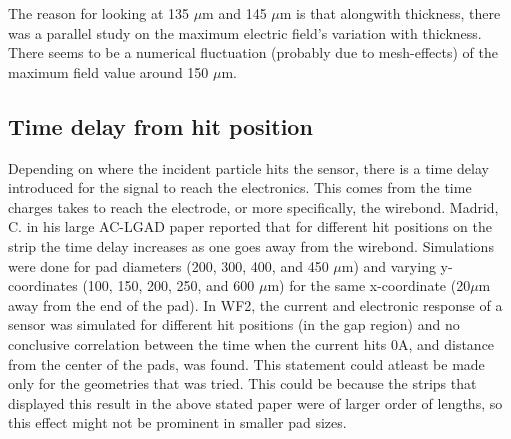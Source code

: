 \documentclass[11pt]{article}
\begin{document}
The reason for looking at 135 $\mu$m and 145 $\mu$m is that alongwith thickness, there was a parallel study on the maximum electric field's variation with thickness. There seems to be a numerical fluctuation (probably due to mesh-effects) of the maximum field value around 150 $\mu$m.

\subsection{Time delay from hit position}
Depending on where the incident particle hits the sensor, there is a time delay introduced for the signal to reach the electronics. This comes from the time charges takes to reach the electrode, or more specifically, the wirebond. Madrid, C. in his large AC-LGAD paper reported that for different hit positions on the strip the time delay increases as one goes away from the wirebond. Simulations were done for pad diameters (200, 300, 400, and 450 $\mu$m) and varying y-coordinates (100, 150, 200, 250, and 600 $\mu$m) for the same x-coordinate (20$\mu$m away from the end of the pad). In WF2, the current and electronic response of a sensor was simulated for different hit positions (in the gap region) and no conclusive correlation between the time when the current hits 0A, and distance from the center of the pads, was found. This statement could atleast be made only for the geometries that was tried. This could be because the strips that displayed this result in the above stated paper were of larger order of lengths, so this effect might not be prominent in smaller pad sizes.
\end{document}
